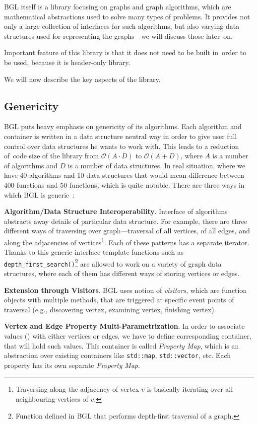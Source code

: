 \documentclass[thesis=B,english]{FITthesis}[2019/03/21]
\begin{document}
BGL itself is a library focusing on graphs and graph algorithms, which are mathematical abstractions used to solve many types of problems. It provides not only a large collection of interfaces for such algorithms, but also varying data structures used for representing the graphs---we will discuss those later~on.

Important feature of this library is that it does not need to be built in~order to be used, because it is header-only library.

We will now describe the key aspects of the library.

\subsection{Genericity}
BGL puts heavy emphasis on genericity of its algorithms. Each algorithm and container is written in a data structure neutral way in order to give user full control over data structures he wants to work with. This leads to a reduction of~code size of the library from $\mathcal{O}(A \cdot D)$ to $\mathcal{O}(A + D)$, where $A$ is a number of algorithms and $D$ is a number of data structures. In real situation, where we have 40 algorithms and 10 data structures that would mean difference between 400 functions and 50 functions, which is quite notable. There are three ways in which BGL is generic~\cite{boost_genericity}:\medskip

\noindent\textbf{Algorithm/Data Structure Interoperability}. Interface of algorithms abstracts away details of particular data structure. For example, there are three different ways of traversing over graph---traversal of all vertices, of all edges, and along the adjacencies of vertices\footnote{Traversing along the adjacency of vertex $v$ is basically iterating over all neighbouring vertices of $v$.}. Each of these patterns has a separate iterator. Thanks to this generic interface template functions such as \texttt{depth\_first\_search()}\footnote{Function defined in BGL that performs depth-first traversal of a graph.} are allowed to work on a variety of graph data structures, where each of them has different ways of storing vertices or edges.\medskip

\noindent\textbf{Extension through Visitors}. BGL uses notion of \emph{visitors}, which are function objects with multiple methods, that are triggered at specific event points of traversal (e.g., discovering vertex, examining vertex, finishing vertex).\medskip

\noindent\textbf{Vertex and Edge Property Multi-Parametrization}. In order to associate values () with either vertices or edges, we have to define corresponding container, that will hold such values. This container is called \emph{Property Map}, which is an abstraction over existing containers like \texttt{std::map}, \texttt{std::vector}, etc. Each property has its own separate \emph{Property Map}.
\end{document}
